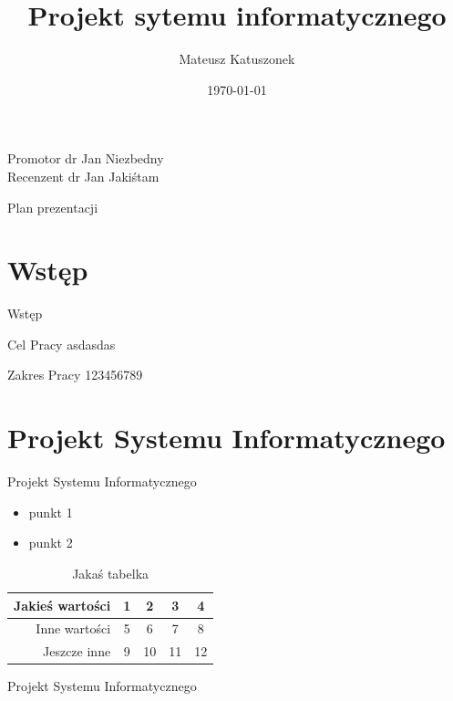 \documentclass[12pt,a4paper]{beamer}
\author{Mateusz Katuszonek}
\title{Projekt sytemu informatycznego}
\institute{Wydzial Informatyki ZUT}
\date{\today}
\begin{document}
\begin{frame}
\maketitle
Promotor dr Jan Niezbedny\\
Recenzent dr Jan Jakiśtam
\end{frame}
\begin{frame}{Plan prezentacji}
    \tableofcontents
\end{frame}
\section{Wstęp}
\begin{frame}{Wstęp}
    \begin{block}{Cel Pracy}
    asdasdas
    \end{block}
   \begin{alertblock}{Zakres Pracy}
    123456789
    \end{alertblock}
\end{frame}
\section{Projekt Systemu Informatycznego}
\begin{frame}{Projekt Systemu Informatycznego}
    \begin{itemize}
        \item punkt 1
        \item punkt 2
    \end{itemize}
    \begin{table}[h]
    \centering
    \caption{Jakaś tabelka}
    \begin{tabular}{|r|c|c|c|c|}
    \hline
        Jakieś wartości &1&2&3&4\\
        \hline
        Inne wartości &5&6&7&8\\ 
        \hline
        Jeszcze inne &9&10&11&12\\
        \hline
    \end{tabular}
    \end{table}
\end{frame}
\begin{frame}{Projekt Systemu Informatycznego}
    \begin{block}
        
    \end{block}
\end{frame}
\end{document}
